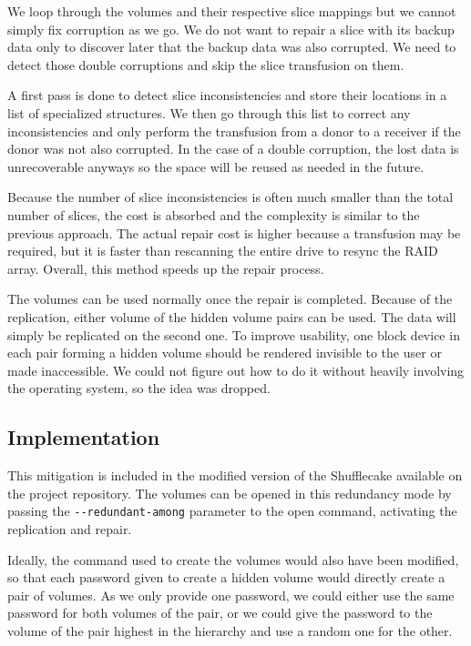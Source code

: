 \documentclass[a4paper,11pt,oneside]{report}
\begin{document}
We loop through the volumes and their respective slice mappings but we cannot simply fix corruption as we go. We do not want to repair a slice with its backup data only to discover later that the backup data was also corrupted. We need to detect those double corruptions and skip the slice transfusion on them.

A first pass is done to detect slice inconsistencies and store their locations in a list of specialized structures. We then go through this list to correct any inconsistencies and only perform the transfusion from a donor to a receiver if the donor was not also corrupted. In the case of a double corruption, the lost data is unrecoverable anyways so the space will be reused as needed in the future.

Because the number of slice inconsistencies is often much smaller than the total number of slices, the cost is absorbed and the complexity is similar to the previous approach. The actual repair cost is higher because a transfusion may be required, but it is faster than rescanning the entire drive to resync the RAID array. Overall, this method speeds up the repair process.

The volumes can be used normally once the repair is completed. Because of the replication, either volume of the hidden volume pairs can be used. The data will simply be replicated on the second one. To improve usability, one block device in each pair forming a hidden volume should be rendered invisible to the user or made inaccessible. We could not figure out how to do it without heavily involving the operating system, so the idea was dropped.

\subsection{Implementation}

This mitigation is included in the modified version of the Shufflecake available on the project repository\cite{github}. The volumes can be opened in this redundancy mode by passing the \verb|--redundant-among| parameter to the open command, activating the replication and repair.

Ideally, the command used to create the volumes would also have been modified, so that each password given to create a hidden volume would directly create a pair of volumes. As we only provide one password, we could either use the same password for both volumes of the pair, or we could give the password to the volume of the pair highest in the hierarchy and use a random one for the other.
\end{document}
